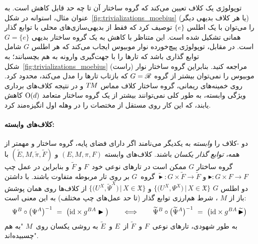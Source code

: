 توپولوژی یک کلاف تعیین می‌کند که گروه ساختار آن تا چه حد قابل کاهش است.
به عنوان مثال، استوانه در شکل~\ref{fig:trivializations_moebius} (یا هر کلاف بدیهی دیگر) را می‌توان با یک اطلس $\{e\}$ توصیف کرد که فقط از بدیهی‌سازی‌های محلی با توابع گذار همانی تشکیل شده است.
این متناظر با کاهش به یک گروه ساختار بدیهی $G=\{e\}$ است.
در مقابل، توپولوژی پیچ‌خورده نوار موبیوس ایجاب می‌کند که هر اطلس $G$ شامل توابع گذاری باشد که تارها را با جهت‌گیری وارونه به هم بچسبانند؛ به شکل~\ref{fig:trivializations_moebius} (راست) مراجعه کنید.
بنابراین گروه ساختار نوار موبیوس را نمی‌توان بیشتر از گروه $G=\mathscr{R}$ که بازتاب تارها را مدل می‌کند، محدود کرد.
روی خمینه‌های ریمانی، گروه ساختار کلاف مماس $T\mkern-1.5muM$ و در نتیجه کلاف‌های برداری ویژگی وابسته، به طور کلی نمی‌توانند بیشتر از یک گروه ساختار متعامد $\operatorname{O}(d)$ کاهش یابند، که این کار روی  مستقل از مختصات را در وهله اول انگیزه‌مند کرد.

\paragraph{کلاف‌های  وابسته:}
دو -کلاف را \emph{وابسته} به یکدیگر می‌نامند اگر دارای فضای پایه، گروه ساختار و مهمتر از همه، \emph{توابع گذار یکسان} باشند.
کلاف‌های وابسته $(E,M,\pi,F)$ و $(\widetilde{E},M,\widetilde{\pi},\widetilde{F})$ با گروه ساختار $G$ ممکن است در تارهای نوعی خود~$F$ و $\widetilde{F}$ و بنابراین در عمل چپ $\blacktriangleright: G \times F\to F$ و $\widetilde{\blacktriangleright}: G \times \widetilde{F}\to \widetilde{F}$ گروه~$G$ بر روی تار مربوطه متفاوت باشند.
با داشتن دو اطلس $G$
$\big\{\big( U^X,              \Psi^X  \big) \,\big|\, X\in\mathfrak{X} \big\}$ و
$\big\{\big( U^X, \widetilde{\Psi}^X \big) \,\big|\, X\in\mathfrak{X} \big\}$
از کلاف‌ها روی همان پوشش باز از $M$ ، شرط هم‌ارزی توابع گذار (تا حد عمل‌های چپ مختلف) به این معنی است:
\begin{align}
	\Psi^B \circ \big(\Psi^A \big)^{-1}\ =\ \big(\id \times g^{BA}\blacktriangleright \big)
	\qquad \Longleftrightarrow \qquad
	\widetilde{\Psi}^B \circ \big(\widetilde{\Psi}^A \big)^{-1}\ =\ \big(\id \times g^{BA}\, \widetilde{\blacktriangleright} \big)
\end{align}
به طور شهودی، تارهای نوعی~$F$ و~$\widetilde{F}$ از~$E$ و~$\widetilde{E}$ به روشی یکسان روی~$M$ "به هم چسبیده‌اند".

